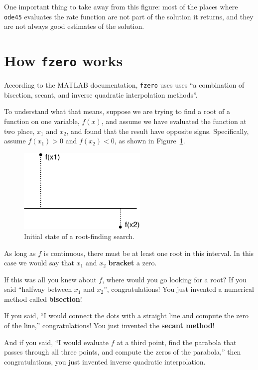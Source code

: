\documentclass[
]{book}
\numberwithin{Answer}{chapter}
\numberwithin{Exercise}{chapter}
\begin{document}
One important thing to take away from this figure: most of the places where {\tt ode45} evaluates the rate function are not part of the solution it returns, and they are not always good estimates of the solution.



\section{How {\tt fzero} works}
\label{sect:howfzero}

According to the MATLAB documentation, {\tt fzero} uses uses ``a combination of bisection, secant, and inverse quadratic interpolation methods''.

To understand what that means, suppose we are trying to find a root of a function on one variable, $f(x)$, and assume we have evaluated the function at two place, $x_1$ and $x_2$, and found that the result have opposite signs.  Specifically, assume $f(x_1) > 0$ and $f(x_2) < 0$, as shown in Figure~\ref{fig:secant}.

\begin{figure}
\centerline{\includegraphics[height=1.6in]{figs/secant.eps}}
\caption{Initial state of a root-finding search.}
\label{fig:secant}
\end{figure}

As long as $f$ is continuous, there must be at least one root in this interval.  In this case we would say that $x_1$ and $x_2$
{\bf bracket} a zero.

If this was all you knew about $f$, where would you go looking for
a root?  If you said ``halfway between $x_1$ and $x_2$'',
congratulations!  You just invented a numerical method called
{\bf bisection}!

If you said, ``I would connect the dots with a straight line
and compute the zero of the line,''
congratulations!  You just invented the {\bf secant method}!

And if you said, ``I would evaluate $f$ at a third point, find the
parabola that passes through all three points, and compute the zeros
of the parabola,'' then congratulations, you just invented inverse quadratic interpolation.
\end{document}
